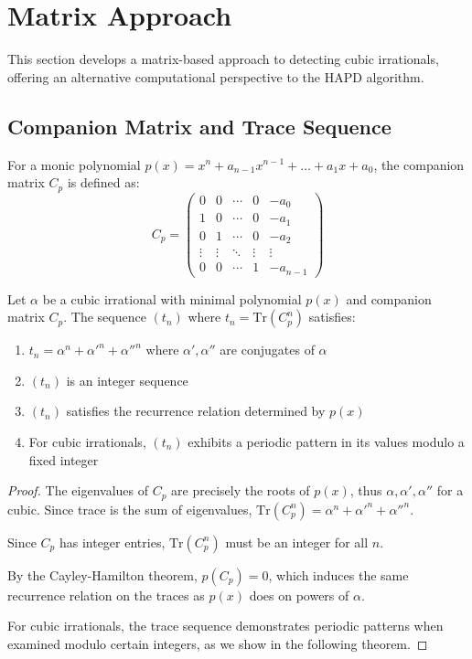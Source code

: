 \section{Matrix Approach}\label{sec:matrix_approach}

This section develops a matrix-based approach to detecting cubic irrationals, offering an alternative computational perspective to the HAPD algorithm.

\subsection{Companion Matrix and Trace Sequence}

\begin{definition}
For a monic polynomial $p(x) = x^n + a_{n-1}x^{n-1} + \ldots + a_1x + a_0$, the companion matrix $C_p$ is defined as:
\begin{equation}
C_p = \begin{pmatrix}
0 & 0 & \cdots & 0 & -a_0 \\
1 & 0 & \cdots & 0 & -a_1 \\
0 & 1 & \cdots & 0 & -a_2 \\
\vdots & \vdots & \ddots & \vdots & \vdots \\
0 & 0 & \cdots & 1 & -a_{n-1}
\end{pmatrix}
\end{equation}
\end{definition}

\begin{theorem}
Let $\alpha$ be a cubic irrational with minimal polynomial $p(x)$ and companion matrix $C_p$. The sequence $(t_n)$ where $t_n = \text{Tr}(C_p^n)$ satisfies:
\begin{enumerate}
    \item $t_n = \alpha^n + \alpha'^n + \alpha''^n$ where $\alpha', \alpha''$ are conjugates of $\alpha$
    \item $(t_n)$ is an integer sequence
    \item $(t_n)$ satisfies the recurrence relation determined by $p(x)$
    \item For cubic irrationals, $(t_n)$ exhibits a periodic pattern in its values modulo a fixed integer
\end{enumerate}
\end{theorem}

\begin{proof}
The eigenvalues of $C_p$ are precisely the roots of $p(x)$, thus $\alpha, \alpha', \alpha''$ for a cubic. Since trace is the sum of eigenvalues, $\text{Tr}(C_p^n) = \alpha^n + \alpha'^n + \alpha''^n$. 

Since $C_p$ has integer entries, $\text{Tr}(C_p^n)$ must be an integer for all $n$. 

By the Cayley-Hamilton theorem, $p(C_p) = 0$, which induces the same recurrence relation on the traces as $p(x)$ does on powers of $\alpha$.

For cubic irrationals, the trace sequence demonstrates periodic patterns when examined modulo certain integers, as we show in the following theorem.
\end{proof}

